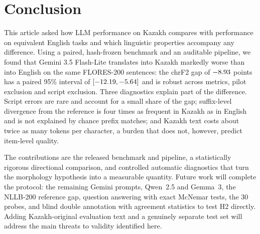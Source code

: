 \section{Conclusion}
\label{sec:conclusion}

This article asked how LLM performance on Kazakh compares with performance on equivalent English tasks and which linguistic properties accompany any difference. Using a paired, hash-frozen benchmark and an auditable pipeline, we found that Gemini 3.5 Flash-Lite translates into Kazakh markedly worse than into English on the same \NPairs{} FLORES-200 sentences: the chrF2 gap of $-8.93$ points has a paired 95\% interval of $[-12.19, -5.64]$ and is robust across metrics, pilot exclusion and script exclusion. Three diagnostics explain part of the difference. Script errors are rare and account for a small share of the gap; suffix-level divergence from the reference is four times as frequent in Kazakh as in English and is not explained by chance prefix matches; and Kazakh text costs about twice as many tokens per character, a burden that does not, however, predict item-level quality.

The contributions are the released benchmark and pipeline, a statistically rigorous directional comparison, and controlled automatic diagnostics that turn the morphology hypothesis into a measurable quantity. Future work will complete the protocol: the remaining Gemini prompts, Qwen~2.5 and Gemma~3, the NLLB-200 reference gap, question answering with exact McNemar tests, the 30 probes, and blind double annotation with agreement statistics to test H2 directly. Adding Kazakh-original evaluation text and a genuinely separate test set will address the main threats to validity identified here.
